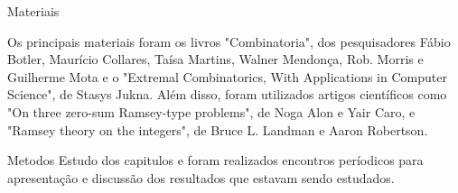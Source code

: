Materiais

Os principais materiais foram os livros "Combinatoria", dos pesquisadores Fábio Botler, Maurício Collares, Taísa Martins, Walner Mendonça, Rob. Morris e Guilherme Mota e o "Extremal Combinatorics, With Applications in Computer Science", de Stasys Jukna. Além disso, foram utilizados artigos científicos como "On three zero-sum Ramsey-type problems", de Noga Alon e Yair Caro, e "Ramsey theory on the integers", de Bruce L. Landman e Aaron Robertson.


Metodos
Estudo dos capitulos e foram realizados encontros períodicos para apresentação e discussão dos resultados que estavam sendo estudados. 